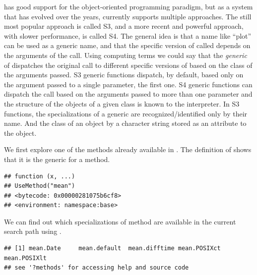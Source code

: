 \documentclass[krantz2]{krantz}\usepackage{knitr}
\begin{document}
\Rlang has good support for the object-oriented programming paradigm, but as a system that has evolved over the years, currently \Rlang supports multiple approaches. The still most popular approach is called S3, and a more recent and powerful approach, with slower performance, is called S4. The general idea is that a name like ``plot'' can be used as a generic name, and that the specific version of  called depends on the arguments of the call. Using computing terms we could say that the \emph{generic} of  dispatches the original call to different specific versions of  based on the class of the arguments passed. S3 generic functions dispatch, by default, based only on the argument passed to a single parameter, the first one. S4 generic functions can dispatch the call based on the arguments passed to more than one parameter and the structure of the objects of a given class is known to the interpreter. In S3 functions, the specializations of a generic are recognized/identified only by their name. And the class of an object by a character string stored as an attribute to the object.

We first explore one of the methods already available in \Rlang. The definition of  shows that it is the generic for a method.

\begin{knitrout}\footnotesize
{}\color{fgcolor}\begin{kframe}
\begin{alltt}
\end{alltt}
\begin{verbatim}
## function (x, ...) 
## UseMethod("mean")
## <bytecode: 0x00000281075b6cf8>
## <environment: namespace:base>
\end{verbatim}
\end{kframe}
\end{knitrout}

We can find out which specializations of method are available in the current search path using .

\begin{knitrout}\footnotesize
{}\color{fgcolor}\begin{kframe}
\begin{alltt}
\end{alltt}
\begin{verbatim}
## [1] mean.Date     mean.default  mean.difftime mean.POSIXct  mean.POSIXlt 
## see '?methods' for accessing help and source code
\end{verbatim}
\end{kframe}
\end{knitrout}
\end{document}
